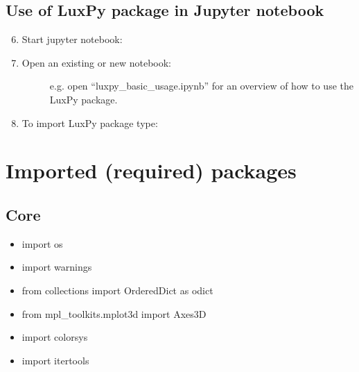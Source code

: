 \documentclass[letterpaper,10pt,english]{sphinxmanual}
\begin{document}
\section{Use of LuxPy package in Jupyter notebook}
\label{\detokenize{installation:use-of-luxpy-package-in-jupyter-notebook}}\begin{enumerate}
\setcounter{enumi}{5}
\item {} 
Start jupyter notebook:
\begin{quote}

\end{quote}

\item {} \begin{description}
\item[{Open an existing or new notebook:}] \leavevmode
e.g. open “luxpy\_basic\_usage.ipynb” for an overview of how to use the LuxPy package.

\end{description}

\item {} 
To import LuxPy package type:
\begin{quote}

\end{quote}

\end{enumerate}


\chapter{Imported (required) packages}
\label{\detokenize{required_packages::doc}}\label{\detokenize{required_packages:imported-required-packages}}

\section{Core}
\label{\detokenize{required_packages:core}}\begin{itemize}
\item {} 
import os

\item {} 
import warnings

\item {} 
from collections import OrderedDict as odict

\item {} 
from mpl\_toolkits.mplot3d import Axes3D

\item {} 
import colorsys

\item {} 
import itertools

\end{itemize}
\end{document}
